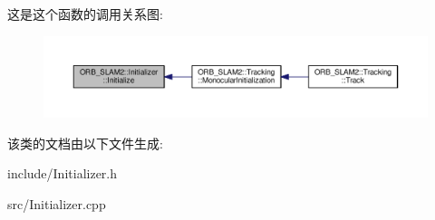 这是这个函数的调用关系图\-:
\nopagebreak
\begin{figure}[H]
\begin{center}
\leavevmode
\includegraphics[width=350pt]{classORB__SLAM2_1_1Initializer_a40d41840e2bdb7199ab024871d028c2c_icgraph}
\end{center}
\end{figure}




该类的文档由以下文件生成\-:\begin{DoxyCompactItemize}
\item 
include/Initializer.\-h\item 
src/Initializer.\-cpp\end{DoxyCompactItemize}
